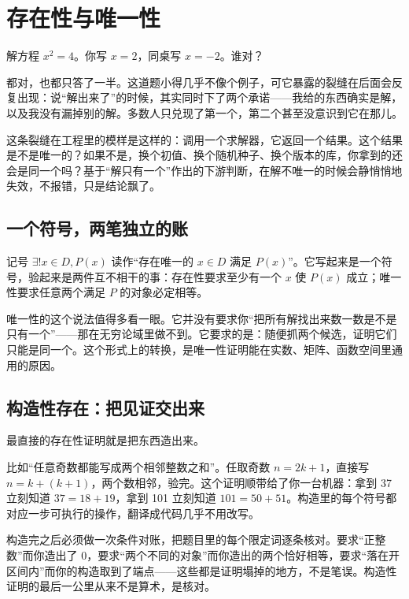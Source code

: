 \section{存在性与唯一性}
\label{sec:01-Mathematical-Language/03-Proof-Techniques/03}

解方程 \(x^2=4\)。你写 \(x=2\)，同桌写 \(x=-2\)。谁对？

都对，也都只答了一半。这道题小得几乎不像个例子，可它暴露的裂缝在后面会反复出现：说``解出来了''的时候，其实同时下了两个承诺——我给的东西确实是解，以及我没有漏掉别的解。多数人只兑现了第一个，第二个甚至没意识到它在那儿。

这条裂缝在工程里的模样是这样的：调用一个求解器，它返回一个结果。这个结果是不是唯一的？如果不是，换个初值、换个随机种子、换个版本的库，你拿到的还会是同一个吗？基于``解只有一个''作出的下游判断，在解不唯一的时候会静悄悄地失效，不报错，只是结论飘了。

\subsection{一个符号，两笔独立的账}

记号 \(\exists!x\in D,P(x)\) 读作``存在唯一的 \(x\in D\) 满足 \(P(x)\)''。它写起来是一个符号，验起来是两件互不相干的事：存在性要求至少有一个 \(x\) 使 \(P(x)\) 成立；唯一性要求任意两个满足 \(P\) 的对象必定相等。

唯一性的这个说法值得多看一眼。它并没有要求你``把所有解找出来数一数是不是只有一个''——那在无穷论域里做不到。它要求的是：随便抓两个候选，证明它们只能是同一个。这个形式上的转换，是唯一性证明能在实数、矩阵、函数空间里通用的原因。

\subsection{构造性存在：把见证交出来}

最直接的存在性证明就是把东西造出来。

比如``任意奇数都能写成两个相邻整数之和''。任取奇数 \(n=2k+1\)，直接写 \(n=k+(k+1)\)，两个数相邻，验完。这个证明顺带给了你一台机器：拿到 37 立刻知道 \(37=18+19\)，拿到 101 立刻知道 \(101=50+51\)。构造里的每个符号都对应一步可执行的操作，翻译成代码几乎不用改写。

构造完之后必须做一次条件对账，把题目里的每个限定词逐条核对。要求``正整数''而你造出了 \(0\)，要求``两个不同的对象''而你造出的两个恰好相等，要求``落在开区间内''而你的构造取到了端点——这些都是证明塌掉的地方，不是笔误。构造性证明的最后一公里从来不是算术，是核对。

